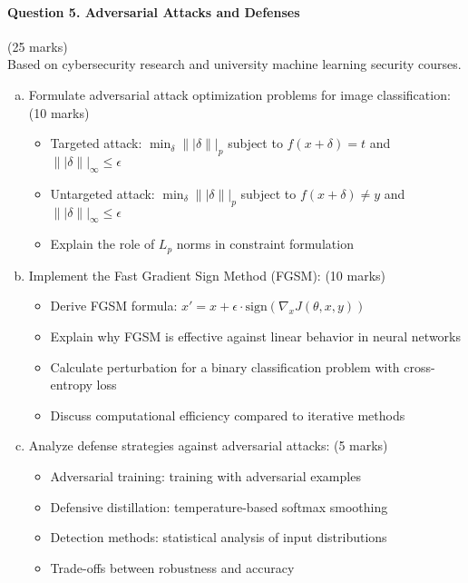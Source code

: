 \documentclass[12pt]{article}
\newcommand{\shortanswer}{\vspace{2cm}}
\newcommand{\mediumanswer}{\vspace{3cm}}
\begin{document}
\newpage
\paragraph{Question 5. Adversarial Attacks and Defenses}{\hfill (25 marks)}\\
Based on cybersecurity research and university machine learning security courses.

\begin{enumerate}[(a)]
    \item Formulate adversarial attack optimization problems for image classification: \hfill (10 marks)
    \begin{itemize}
        \item Targeted attack: $\min_{\delta} \||\delta\||_p$ subject to $f(x + \delta) = t$ and $\||\delta\||_\infty \leq \epsilon$
        \item Untargeted attack: $\min_{\delta} \||\delta\||_p$ subject to $f(x + \delta) \neq y$ and $\||\delta\||_\infty \leq \epsilon$
        \item Explain the role of $L_p$ norms in constraint formulation
    \end{itemize}
    
    \mediumanswer
    
    \item Implement the Fast Gradient Sign Method (FGSM): \hfill (10 marks)
    \begin{itemize}
        \item Derive FGSM formula: $x' = x + \epsilon \cdot \text{sign}(\nabla_x J(\theta, x, y))$
        \item Explain why FGSM is effective against linear behavior in neural networks
        \item Calculate perturbation for a binary classification problem with cross-entropy loss
        \item Discuss computational efficiency compared to iterative methods
    \end{itemize}
    
    \mediumanswer
    
    \item Analyze defense strategies against adversarial attacks: \hfill (5 marks)
    \begin{itemize}
        \item Adversarial training: training with adversarial examples
        \item Defensive distillation: temperature-based softmax smoothing
        \item Detection methods: statistical analysis of input distributions
        \item Trade-offs between robustness and accuracy
    \end{itemize}
    
    \shortanswer
\end{enumerate}
\end{document}
